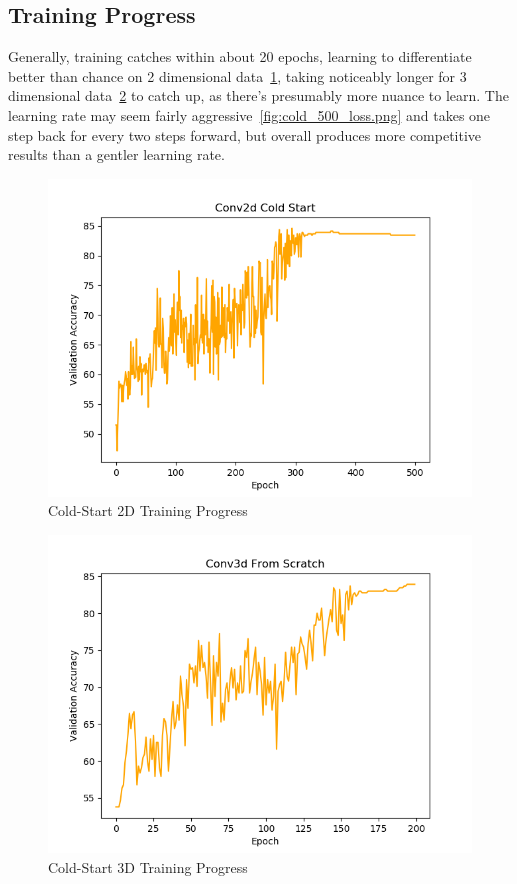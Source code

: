\subsection{Training Progress}\label{subsec:training-prog}

Generally, training catches within about 20 epochs, learning to differentiate better than chance on 2
dimensional data~\ref{fig:2d_cold}, taking noticeably longer for 3 dimensional data~\ref{fig:3d_cold} to catch up,
as there's presumably more nuance to learn.
The learning rate may seem fairly aggressive~\ref{fig:cold_500_loss.png}
and takes one step back for every two steps forward, but overall produces
more competitive results than a gentler learning rate.

 \begin{figure}
  \includegraphics[width=\linewidth]{images/2d_cold.png}
  \caption{Cold-Start 2D Training Progress}
  \label{fig:2d_cold}
\end{figure}

 \begin{figure}
  \includegraphics[width=\linewidth]{images/3d_cold.png}
  \caption{Cold-Start 3D Training Progress}
  \label{fig:3d_cold}
\end{figure}

